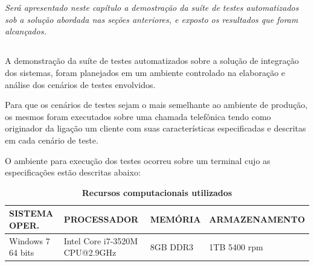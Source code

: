 \chapter[Demonstração da Suíte de Testes Automatizados]{\fontsize{12}{1} }

\textit{Será apresentado neste capítulo a demostração da suíte de testes automatizados sob a solução abordada nas seções anteriores, e exposto os resultados que foram alcançados.}


\section{\fontsize{12}{1} }

A demonstração da suíte de testes automatizados sobre a solução de integração dos sistemas, foram planejados em um ambiente controlado na elaboração e análise dos cenários de testes envolvidos. 

Para que os cenários de testes sejam o mais semelhante ao ambiente de produção, os mesmos foram executados sobre uma chamada telefônica tendo como originador da ligação um cliente com suas características especificadas e descritas em cada cenário de teste. 

O ambiente para execução dos testes ocorreu sobre um terminal cujo as especificações estão descritas abaixo:

\begin{table}[htb]
	\footnotesize
	\caption{\textbf{Recursos computacionais utilizados}}
	\label{tabela:recursosUtilizados}
	\begin{tabular}{|p{3.5cm}|p{3cm}|p{2cm}|p{4cm}|} \hline
		\textbf{SISTEMA OPER.} 	& \textbf{PROCESSADOR} 				& \textbf{MEMÓRIA} 	& \textbf{ARMAZENAMENTO}  \\ \hline
		Windows 7 64 bits 		& Intel Core i7-3520M CPU@2.9GHz 	& 8GB DDR3			& 1TB 5400 rpm \\ \hline
	\end{tabular}\\[6pt]
	\fontsize{10}{12}\selectfont {Fonte: Autoria Própria.}
\end{table}

